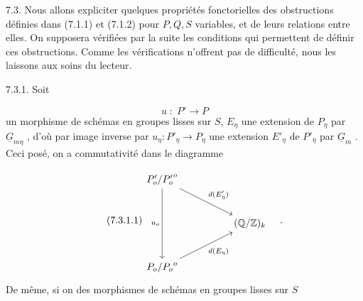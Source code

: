 7.3. Nous allons expliciter quelques propriétés fonctorielles des obstructions définies dans (7.1.1) et (7.1.2) pour $P,Q,S$ variables, et de leurs relations entre elles. On supposera vérifiées par la suite les conditions qui permettent de définir ces obstructions. Comme les vérifications n'offrent pas de difficulté, nous les laissons aux soins du lecteur.

7.3.1. Soit

\begin{equation*}
u \; : \; P' \longrightarrow P
\end{equation*}
un morphisme de schémas en groupes lisses sur $S$, $E_\eta$ une extension de $P_\eta$ par $\underline{G}_{m\eta}$ , d'où par image inverse par $u_\eta : P'_\eta \longrightarrow P_\eta$ une extension $E'_\eta$ de $P'_\eta$ par $\underline{G}_m$ . Ceci posé, on a commutativité dans le diagramme 



\begin{equation}\tag{7.3.1.1}
\begin{tikzcd}[row sep=large, column sep=huge]
{P'_o/{P'_o}^{o}} \arrow[dd, "u_o"'] \arrow[rd, "d(E'_\eta)"] & \\
 & {(\mathbb{Q}/\mathbb{Z})_k} \\
{P_o/{P_o}^{o}} \arrow[ru, "d(E_\eta)"'] &
\end{tikzcd}\quad .
\end{equation}
De même, si on des morphismes de schémas en groupes lisses sur $S$

